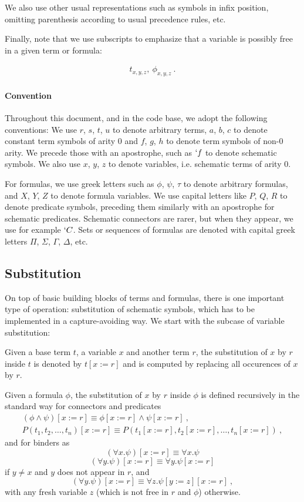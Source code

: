 We also use other usual representations such as symbols in infix position, omitting parenthesis according to usual precedence rules, etc.

Finally, note that we use subscripts to emphasize that a variable is possibly free in a given term or formula:

\begin{gather*}
  t_{x,y,z}, ~\phi_{x,y,z}~.
\end{gather*}

\paragraph{Convention} Throughout this document, and in the code base, we adopt the following conventions: We use $r$, $s$, $t$, $u$ to denote arbitrary terms, $a$, $b$, $c$ to denote constant term symbols of arity $0$ and $f$, $g$, $h$ to denote term symbols of non-0 arity. We precede those with an apostrophe, such as $`f$ to denote schematic symbols. We also use $x$, $y$, $z$ to denote variables, i.e. schematic terms of arity $0$.

For formulas, we use greek letters such as $\phi$, $\psi$, $\tau$ to denote arbitrary formulas, and $X$, $Y$, $Z$ to denote formula variables. We use capital letters like $P$, $Q$, $R$ to denote predicate symbols, preceding them similarly with an apostrophe for schematic predicates. Schematic connectors are rarer, but when they appear, we use for example $`C$. Sets or sequences of formulas are denoted with capital greek letters $\Pi$, $\Sigma$, $\Gamma$, $\Delta$, etc.

\subsection{Substitution}
\label{subsec:substitution}
On top of basic building blocks of terms and formulas, there is one important type of operation: substitution of schematic symbols, which has to be implemented in a capture-avoiding way. We start with the subcase of variable substitution:
\begin{definition}
  Given a base term $t$, a variable $x$ and another term $r$, the substitution of $x$ by $r$ inside $t$ is denoted by $ t[x := r] $ and is computed by replacing all occurences of $x$ by $r$.

  Given a formula $\phi$, the substitution of $x$ by $r$ inside $\phi$ is defined recursively in the standard way for connectors and predicates
  \begin{gather*}
    (\phi \land \psi)[x := r] \equiv \phi[x := r] \land \psi[x := r]~,\\
    P(t_1, t_2, \ldots, t_n)[x := r] \equiv P(t_1[x := r], t_2[x := r], \ldots, t_n[x := r])~,
  \end{gather*}
  and for binders as
  $$
    (\forall x. \psi)[x := r] \equiv \forall x. \psi
  $$
  $$
    (\forall y. \psi)[x := r] \equiv \forall y. \psi[x := r]
  $$
  if $y \neq x$ and $y$ does not appear in $r$, and
  $$
    (\forall y. \psi)[x := r] \equiv \forall z. \psi[y := z][x := r]~,
  $$
  with any fresh variable $z$ (which is not free in $r$ and $\phi$) otherwise.
\end{definition}


